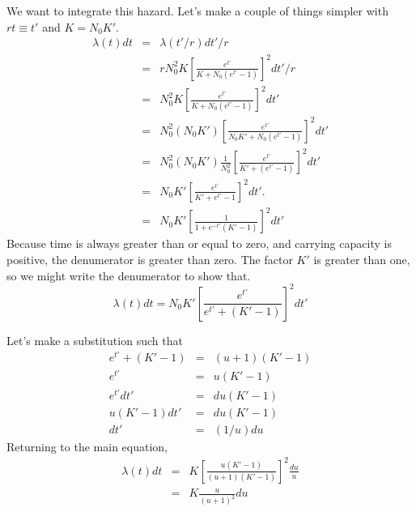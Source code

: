 \documentclass{article}
\begin{document}
We want to integrate this hazard. Let's make a couple of things simpler
with $rt\equiv t'$ and $K=N_0K'$.
\begin{eqnarray}
  \lambda(t)dt & = & \lambda(t'/r)dt'/r \\
  &=&rN_0^2K\left[
    \frac{e^{t'}}{K+N_0(e^{t'}-1)}\right]^2dt'/r \\
  &=&N_0^2K\left[
    \frac{e^{t'}}{K+N_0(e^{t'}-1)}\right]^2dt' \\
  &=&N_0^2(N_0K')\left[
    \frac{e^{t'}}{N_0K'+N_0(e^{t'}-1)}\right]^2dt' \\
  &=&N_0^2(N_0K')\frac{1}{N_0^2}\left[
    \frac{e^{t'}}{K'+(e^{t'}-1)}\right]^2dt' \\
  & = & N_0K'\left[\frac{e^{t'}}{K'+e^{t'}-1}\right]^2dt'.\label{eqn:hazardrescale} \\
  & = & N_0K'\left[\frac{1}{1+e^{-t'}(K'-1)}\right]^2dt'
\end{eqnarray}
Because time is always greater than or equal to zero, and carrying
capacity is positive, the denumerator is greater than zero.
The factor $K'$ is greater than one, so we might write the denumerator
to show that.
\begin{equation}
  \lambda(t)dt =N_0K'\left[\frac{e^{t'}}{e^{t'}+(K'-1)}\right]^2dt'
\end{equation}

Let's make a substitution such that
\begin{eqnarray}
  e^{t'}+(K'-1)& = & (u + 1)(K'-1) \\
  e^{t'} & = & u(K'-1) \\
  e^{t'}dt' & = & du(K'-1) \\
  u(K'-1)dt' & = & du(K'-1) \\
  dt' & = & (1/u)du
\end{eqnarray}
Returning to the main equation,
\begin{eqnarray}
  \lambda(t)dt & = & K\left[\frac{u(K'-1)}{(u+1)(K'-1)}\right]^2
      \frac{du}{u} \\
  & = & K\frac{u}{(u+1)^2}du \\
\end{eqnarray}
\end{document}
